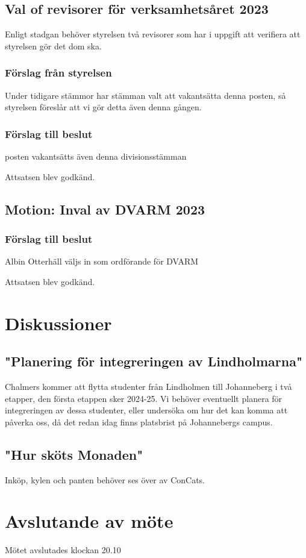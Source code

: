 \documentclass[protokoll]{dvd}
\begin{document}
\subsection*{Val of revisorer för verksamhetsåret 2023}
Enligt stadgan behöver styrelsen två revisorer som har i uppgift
att verifiera att styrelsen gör det dom ska.

\subsubsection*{Förslag från styrelsen}
Under tidigare stämmor har stämman valt att vakantsätta denna posten,
så styrelsen föreslår att vi gör detta även denna gången.

\subsubsection*{Förslag till beslut}
\begin{attsatser}
    \item posten vakantsätts även denna divisionsstämman
\end{attsatser}

Attsatsen blev godkänd.

\subsection*{Motion: Inval av DVARM 2023}

\subsubsection*{Förslag till beslut}
\begin{attsatser}
    \item Albin Otterhäll väljs in som ordförande för DVARM
\end{attsatser}

Attsatsen blev godkänd.

\section{Diskussioner}\label{sec:discussioner}

\subsection{"Planering för integreringen av Lindholmarna"}
Chalmers kommer att flytta studenter från Lindholmen till Johanneberg i två etapper, den första etappen sker 2024-25.
Vi behöver eventuellt planera för integreringen av dessa studenter, eller undersöka om hur det kan komma att påverka oss,
då det redan idag finns platsbrist på Johannebergs campus.


\subsection{"Hur sköts Monaden" }
Inköp, kylen och panten behöver ses över av ConCats.

\section{Avslutande av möte}

Mötet avslutades klockan 20.10

\end{document}
